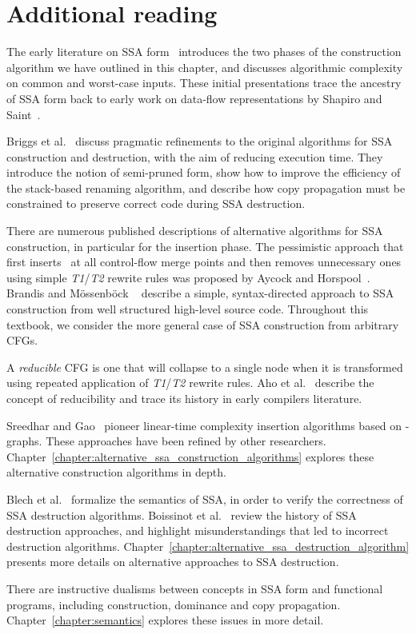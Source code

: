 {\section{Additional reading}
\label{sec:classical_construction_algorithm:reading}

The early literature on SSA form~\cite{cytron89efficient,cytron91efficiently} introduces the two phases of the construction algorithm we have outlined in this chapter, and discusses algorithmic complexity on common and worst-case inputs. 
These initial presentations trace the ancestry of SSA form back to early work on data-flow representations by Shapiro and Saint~\cite{shapiro69representation}.

Briggs et al.~\cite{briggs98practical} discuss pragmatic refinements to the original algorithms for SSA construction and destruction, with the aim of reducing execution time. 
They introduce the notion of semi-pruned form, show how to improve the efficiency of the stack-based renaming algorithm, and describe how copy propagation must be constrained to preserve correct code during SSA destruction.

There are numerous published descriptions of alternative algorithms for SSA construction, in particular for the \phifun insertion phase. 
The pessimistic approach that first inserts \phifuns\ at all control-flow merge points and then removes unnecessary ones using simple \emph{T1}/\emph{T2} rewrite rules was proposed by Aycock and Horspool~\cite{aycock00simple}. 
Brandis and M\"{o}ssenb\"{o}ck ~\cite{brandis94single} describe a simple, syntax-directed approach to SSA construction from well structured high-level source code. 
Throughout this textbook, we consider the more general case of SSA construction from arbitrary CFGs.

A \textit{reducible} CFG is one that will collapse to a single node when it is transformed using repeated application of \emph{T1}/\emph{T2} rewrite rules. 
Aho et al.~\cite{aho86compilers} describe the concept of reducibility and trace its history in early compilers literature.

Sreedhar and Gao~\cite{Sreedhar:1995:PoPL} pioneer linear-time complexity \phifun insertion algorithms based on \DJ-graphs. 
These approaches have been refined by other researchers. 
Chapter~\ref{chapter:alternative_ssa_construction_algorithms} explores these alternative construction algorithms in depth.


Blech et al.~\cite{blech05optimizing} formalize the semantics of SSA, in order to verify the correctness of SSA destruction algorithms. 
Boissinot et al.~\cite{boissinot09revisiting} review the history of SSA destruction approaches, and highlight misunderstandings that led to incorrect destruction algorithms. 
Chapter~\ref{chapter:alternative_ssa_destruction_algorithm} presents more details on alternative approaches to SSA destruction.

There are instructive dualisms between concepts in SSA form and functional programs, including construction, dominance and copy propagation. 
Chapter~\ref{chapter:semantics} explores these issues in more detail.


}

